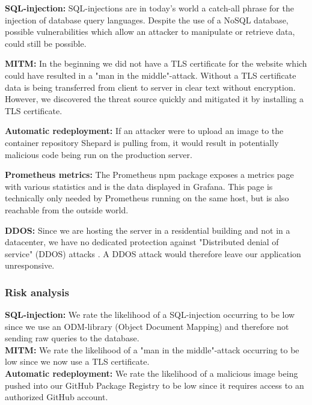 \documentclass{article}
\begin{document}
\textbf{SQL-injection:}
SQL-injections are in today's world a catch-all phrase for the injection of database query languages. Despite the use of a NoSQL database, possible vulnerabilities which allow an attacker to manipulate or retrieve data, could still be possible. 
\vspace{10pt}
\noindent

\textbf{MITM:}
In the beginning we did not have a TLS certificate for the website which could have resulted in a "man in the middle"-attack. Without a TLS certificate data is being transferred from client to server in clear text without encryption. However, we discovered the threat source quickly and mitigated it by installing a TLS certificate.

\vspace{10pt}
\noindent
\textbf{Automatic redeployment:}
If an attacker were to upload an image to the container repository Shepard is pulling from, it would result in potentially malicious code being run on the production server.

\vspace{10pt}
\noindent
\textbf{Prometheus metrics:}
The Prometheus npm package exposes a metrics page with various statistics and is the data displayed in Grafana. This page is technically only needed by Prometheus running on the same host, but is also reachable from the outside world. 

\vspace{10pt}
\noindent
\textbf{DDOS:}
Since we are hosting the server in a residential building and not in a datacenter, we have no dedicated protection against "Distributed denial of service" (DDOS) attacks \cite{ddos}. A DDOS attack would therefore leave our application unresponsive.

\subsubsection{Risk analysis}

\textbf{SQL-injection:} We rate the likelihood of a SQL-injection occurring to be low since we use an ODM-library (Object Document Mapping) and therefore not sending raw queries to the database.\\

\textbf{MITM:} We rate the likelihood of a "man in the middle"-attack occurring to be low since we now use a TLS certificate.\\

\textbf{Automatic redeployment:} We rate the likelihood of a malicious image being pushed into our GitHub Package Registry to be low since it requires access to an authorized GitHub account.\\
\end{document}
